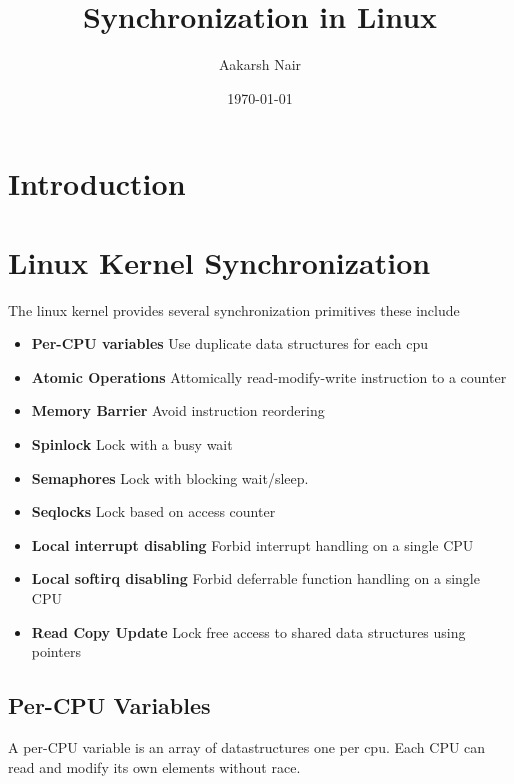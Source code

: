 \documentclass{article}
\title{Synchronization in Linux}
\author{Aakarsh Nair}
\date{\today}
\begin{document}
\maketitle


\setcounter{tocdepth}{3}
\tableofcontents

\maketitle

\vspace*{1cm}
\section{Introduction}

\section{Linux Kernel Synchronization}


The linux kernel provides several synchronization primitives these include

\begin{itemize}
\item \textbf{Per-CPU variables}
  Use duplicate data structures for each cpu
\item \textbf{Atomic Operations}
  Attomically read-modify-write instruction to a counter
\item \textbf{Memory Barrier}
  Avoid instruction reordering
\item  \textbf{Spinlock}
  Lock with a busy wait
\item \textbf{Semaphores}
  Lock with blocking wait/sleep.
\item \textbf{Seqlocks}
  Lock based on access counter
\item \textbf{Local interrupt disabling}
  Forbid interrupt handling on a single CPU
\item \textbf{Local softirq disabling}
  Forbid deferrable function handling on a single CPU
\item \textbf{Read Copy Update}
  Lock free access to shared data structures using pointers
\end{itemize}


\subsection{Per-CPU Variables}

A per-CPU variable is an array of datastructures one per cpu. Each CPU
can read and modify its own elements without race. 
\end{document}
